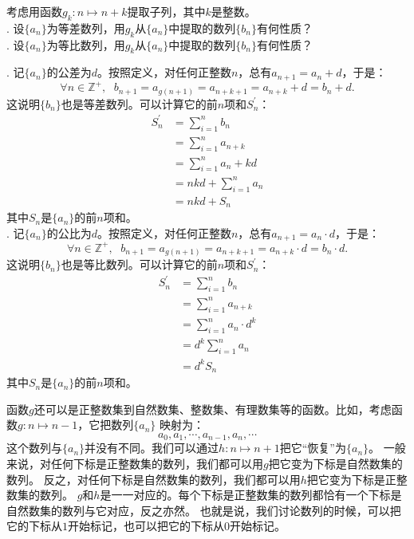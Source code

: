 \documentclass[12pt,UTF8]{ctexbook}
\begin{document}
\begin{et}
    考虑用函数$g_k: n\mapsto n + k$提取子列，其中$k$是整数。\\
    . 设$\{a_n\}$为等差数列，用$g_k$从$\{a_n\}$中提取的数列$\{b_n\}$有何性质？\\
    . 设$\{a_n\}$为等比数列，用$g_k$从$\{a_n\}$中提取的数列$\{b_n\}$有何性质？
\end{et}
\begin{so}
    . 记$\{a_n\}$的公差为$d$。按照定义，对任何正整数$n$，总有$a_{n+1} = a_n + d$，于是：
    $$ \forall n\in \mathbb{Z}^+, \;\,\, b_{n+1} = a_{g(n+1)} = a_{n+k+1} = a_{n+k} + d = b_n + d.$$
    这说明$\{b_n\}$也是等差数列。可以计算它的前$n$项和$S_n^\prime$：
    \begin{align*}
        S_n^\prime &= \sum_{i=1}^n b_n  \\
            &= \sum_{i=1}^n a_{n+k}  \\
            &= \sum_{i=1}^n a_{n} + kd  \\
            &= nkd + \sum_{i=1}^n a_{n}  \\
            &= nkd + S_n 
    \end{align*}
    其中$S_n$是$\{a_n\}$的前$n$项和。\\
    . 记$\{a_n\}$的公比为$d$。按照定义，对任何正整数$n$，总有$a_{n+1} = a_n \cdot d$，于是：
    $$ \forall n\in \mathbb{Z}^+, \;\,\, b_{n+1} = a_{g(n+1)} = a_{n+k+1} = a_{n+k} \cdot d = b_n \cdot d.$$
    这说明$\{b_n\}$也是等比数列。可以计算它的前$n$项和$S_n^\prime$：
    \begin{align*}
        S_n^\prime &= \sum_{i=1}^n b_n  \\
            &= \sum_{i=1}^n a_{n+k}  \\
            &= \sum_{i=1}^n a_{n} \cdot d^k  \\
            &= d^k \sum_{i=1}^n a_{n}  \\
            &= d^k S_n 
    \end{align*}
    其中$S_n$是$\{a_n\}$的前$n$项和。\\
\end{so}

函数$g$还可以是正整数集到自然数集、整数集、有理数集等的函数。比如，考虑函数$g:n\mapsto n-1$，它把数列$\{a_n\}$
映射为：
$$ a_0, a_1, \cdots, a_{n-1}, a_n,\cdots$$
这个数列与$\{a_n\}$并没有不同。我们可以通过$h:n\mapsto n+1$把它“恢复”为$\{a_n\}$。
一般来说，对任何下标是正整数集的数列，我们都可以用$g$把它变为下标是自然数集的数列。
反之，对任何下标是自然数集的数列，我们都可以用$h$把它变为下标是正整数集的数列。
$g$和$h$是一一对应的。每个下标是正整数集的数列都恰有一个下标是自然数集的数列与它对应，反之亦然。
也就是说，我们讨论数列的时候，可以把它的下标从$1$开始标记，也可以把它的下标从$0$开始标记。
\end{document}
